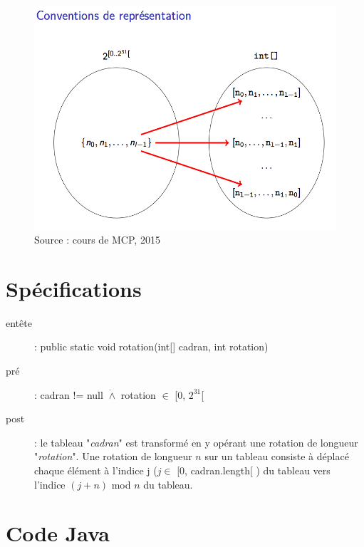 \documentclass[a4paper, 12pt]{article}
\begin{document}
\begin{figure}[h]
   \includegraphics[scale=0.5]{Conventions.png}
   \caption{Source : cours de MCP, 2015}
\end{figure}

\section{Spécifications}

\begin{description}
\item[entête]: public static void rotation(int[] cadran, int rotation)
\item[pré]: cadran != null  $\dot{\wedge}$ rotation $\in$ [0, $2^{31}$[
\item[post]: le tableau "\textit{cadran}" est transformé en y opérant une rotation de longueur "\textit{rotation}". Une rotation de longueur $n$ sur un tableau consiste à déplacé chaque élément à l'indice j ($j \in$ [0, cadran.length[ ) du tableau vers l'indice $(j+n)$ mod $n$ du tableau.
\end{description}

\newpage
\section{Code Java}
\end{document}
